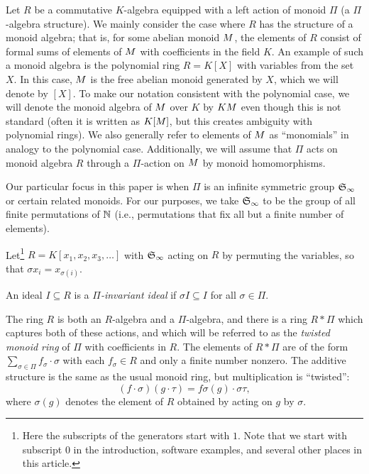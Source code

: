 Let $R$ be a commutative $K$-algebra equipped with a left action of monoid $\Pi$ (a $\Pi$-algebra structure).  We mainly consider the case where $R$ has the structure of a monoid algebra; that is, for some abelian monoid $M$, the elements of $R$ consist of formal sums of elements of $M$ with coefficients in the field $K$.  An example of such a monoid algebra is the polynomial ring $R = K[X]$ with variables from the set $X$.  In this case, $M$ is the free abelian monoid generated by $X$, which we will denote by $[X]$.  To make our notation consistent with the polynomial case, we will denote the monoid algebra of $M$ over $K$ by $KM$ even though this is not standard (often it is written as $K[M]$, but this creates ambiguity with polynomial rings).  We also generally refer to elements of $M$ as ``monomials'' in analogy to the polynomial case.  Additionally, we will assume that $\Pi$ acts on monoid algebra $R$ through a $\Pi$-action on $M$ by monoid homomorphisms.

Our particular focus in this paper is when $\Pi$ is an infinite symmetric group $\mathfrak S_\infty$ or certain related monoids.  For our purposes, we take $\mathfrak S_\infty$ to be the group of all finite permutations of $\mathbb N$ (i.e., permutations that fix all but a finite number of elements).

\begin{example}
 Let\footnote{Here the subscripts of the generators start with $1$. Note that we start with subscript $0$ in the introduction, software examples, and several other places in this article.} $R = K[x_1,x_2,x_3,\ldots]$ with $\mathfrak S_\infty$ acting on $R$ by permuting the variables, so that $\sigma x_i = x_{\sigma(i)}$.
\end{example}

\begin{definition}
 An ideal $I \subseteq R$ is a {\em $\Pi$-invariant ideal} if $\sigma I \subseteq I$ for all $\sigma \in \Pi$.
\end{definition}

The ring $R$ is both an $R$-algebra and a $\Pi$-algebra, and there is a ring $R*\Pi$ which captures both of these actions, and which will be referred to as the {\em twisted monoid ring} of $\Pi$ with coefficients in $R$.  The elements of $R*\Pi$ are of the form $\sum_{\sigma \in \Pi} f_{\sigma}\cdot \sigma$ with each $f_\sigma \in R$ and only a finite number nonzero.  The additive structure is the same as the usual monoid ring, but multiplication is ``twisted'':
 \[ (f\cdot \sigma)(g \cdot \tau) = f\sigma(g) \cdot \sigma\tau,\]
where $\sigma(g)$ denotes the element of $R$ obtained by acting on $g$ by $\sigma$.

